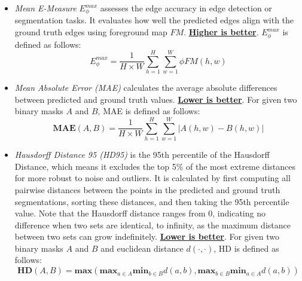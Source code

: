 \begin{itemize}
    \item \textit{Mean E-Measure} $E_{\phi}^{max}$ \cite{fan2018enhanced} assesses the edge accuracy in edge detection or segmentation tasks. It evaluates how well the predicted edges align with the ground truth edges using foreground map $FM$. \textbf{\underline{Higher is better}}. $E_{\phi}^{max}$ is defined as follows: \\
    \begin{equation}
        E_{\phi}^{max} = \frac{1}{H \times W} \sum_{h = 1}^{H} \sum_{w = 1}^{W} \phi FM(h, w)
    \end{equation}

    \item \textit{Mean Absolute Error (MAE)} calculates the average absolute differences between predicted and ground truth values. \textbf{\underline{Lower is better}}. For given two binary masks $A$ and $B$, MAE is defined as follows: \\
    \begin{equation}
        \textbf{MAE}(A, B) = \frac{1}{H \times W} \sum_{h = 1}^{H} \sum_{w = 1}^{W} \left| A(h, w) - B(h, w) \right|
    \end{equation}

    \item \textit{Hausdorff Distance 95 (HD95)} \cite{celaya2023generalized} is the 95th percentile of the Hausdorff Distance, which means it excludes the top 5\% of the most extreme distances for more robust to noise and outliers. It is calculated by first computing all pairwise distances between the points in the predicted and ground truth segmentations, sorting these distances, and then taking the 95th percentile value. Note that the Hausdorff distance ranges from 0, indicating no difference when two sets are identical, to infinity, as the maximum distance between two sets can grow indefinitely. \textbf{\underline{Lower is better}}. For given two binary masks $A$ and $B$ and euclidean distance $d(\cdot, \cdot)$, HD is defined as follows:
    \begin{dmath}
        \textbf{HD}(A, B) = \textbf{max} \left( \textbf{max}_{a \in A} \textbf{min}_{b \in B} d(a, b), \textbf{max}_{b \in B} \textbf{min}_{a \in A} d(a, b) \right)
    \end{dmath}
\end{itemize}

